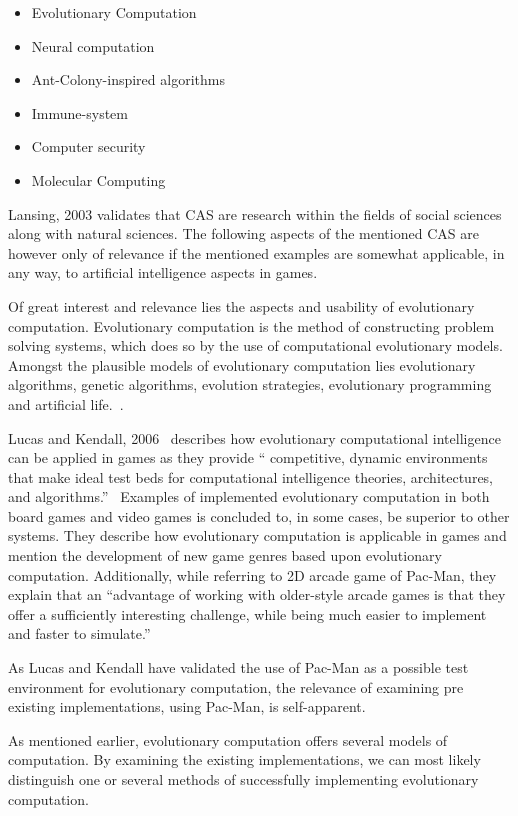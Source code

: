	\begin{itemize}
	\item Evolutionary Computation
	\item Neural computation
	\item Ant-Colony-inspired algorithms
	\item Immune-system
	\item Computer security
	\item Molecular Computing
	 \end{itemize}

Lansing, 2003 \cite{Lansing2003} validates that CAS are research within the fields of social sciences along with natural sciences.  The following aspects of the mentioned CAS are however only of relevance if the mentioned examples are somewhat applicable, in any way, to artificial intelligence aspects in games.

Of great interest and relevance lies the aspects and usability of evolutionary computation. Evolutionary computation is the method of constructing problem solving systems, which does so by the use of computational evolutionary models.\cite{Howe2010} Amongst the plausible models of evolutionary computation lies evolutionary algorithms, genetic algorithms, evolution strategies, evolutionary programming and artificial life.~\cite{Howe2010}.

Lucas and Kendall, 2006~\cite{Lucas2006} describes how evolutionary computational intelligence can be applied in games as they provide \enquote{ competitive, dynamic environments that make ideal test beds for computational intelligence theories, architectures, and algorithms.}~\cite[pp. 10]{Lucas2006}
Examples of implemented evolutionary computation in both board games and video games is concluded to, in some cases, be superior to other systems. They describe how evolutionary computation is applicable in games and mention the development of new game genres based upon evolutionary computation. Additionally, while referring to 2D arcade game of Pac-Man, they explain that an \enquote{advantage of working with older-style arcade games is that they offer a sufficiently interesting challenge, while being much easier to implement and faster to simulate.} \cite[pp 15]{Lucas2006}

As Lucas and Kendall have validated the use of Pac-Man as a possible test environment for evolutionary computation, the relevance of examining pre existing implementations, using Pac-Man, is self-apparent.

As mentioned earlier, evolutionary computation offers several models of computation. By examining the existing implementations, we can most likely distinguish one or several methods of successfully implementing evolutionary computation.

